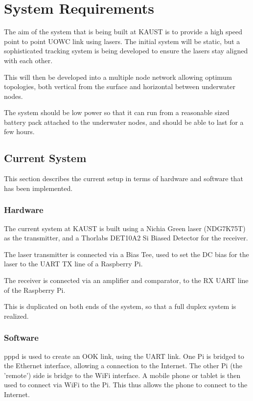 \section{System Requirements}
The aim of the system that is being built at \ac{KAUST} is to provide a high
speed point to point \ac{UOWC} link using lasers. The initial system will be
static, but a sophisticated tracking system is being developed to ensure the
lasers stay aligned with each other.

This will then be developed into a multiple node network allowing optimum
topologies, both vertical from the surface and horizontal between underwater
nodes.

The system should be low power so that it can run from a reasonable sized
battery pack attached to the underwater nodes, and should be able to last for
a few hours.

\subsection{Current System}
This section describes the current setup in terms of hardware and software
that has been implemented.

\subsubsection{Hardware}
The current system at \ac{KAUST} is built using a Nichia Green laser (NDG7K75T)
as the transmitter, and a Thorlabs DET10A2 Si Biased Detector for the receiver.

The laser transmitter is connected via a Bias Tee, used to set the DC bias
for the laser to the \ac{UART} TX line of a Raspberry Pi.

The receiver is connected via an amplifier and comparator, to the RX UART
line of the Raspberry Pi.

This is duplicated on both ends of the system, so that a full duplex
system is realized.

\subsubsection{Software}
pppd is used to create an OOK link, using the \ac{UART} link. One Pi is
bridged to the Ethernet interface, allowing a connection to the Internet.
The other Pi (the 'remote') side is bridge to the WiFi interface. A mobile
phone or tablet is then used to connect via WiFi to the Pi. This thus allows
the phone to connect to the Internet.

